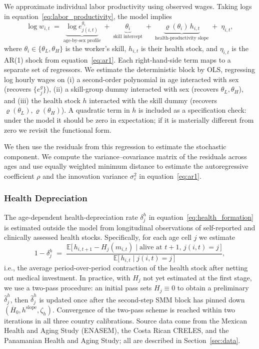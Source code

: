 \documentclass[12pt,a4paper]{article}
\begin{document}
We approximate individual labor productivity using observed wages. Taking logs in equation~\eqref{eq:labor_productivity}, the model implies
\begin{equation}
\label{eq:logwage_decomp}
\log w_{i,t} \;=\; \underbrace{\log e^{g_i}_{j(i,t)}}_{\text{age-by-sex profile}} \;+\; \underbrace{\theta_{i}}_{\text{skill intercept}} \;+\; \underbrace{\varrho(\theta_i)\, h_{i,t}}_{\text{health-productivity slope}} \;+\; \eta_{i,t},
\end{equation}
where $\theta_i \in \{\theta_L, \theta_H\}$ is the worker's skill, $h_{i,t}$ is their health stock, and $\eta_{i,t}$ is the AR(1) shock from equation~\eqref{eq:ar1}. Each right-hand-side term maps to a separate set of regressors. We estimate the deterministic block by OLS, regressing log hourly wages on (i) a second-order polynomial in age interacted with sex (recovers $\{e^{g}_{j}\}$), (ii) a skill-group dummy interacted with sex (recovers $\theta_L, \theta_H$), and (iii) the health stock $h$ interacted with the skill dummy (recovers $\varrho(\theta_L), \varrho(\theta_H)$). A quadratic term in $h$ is included as a specification check: under the model it should be zero in expectation; if it is materially different from zero we revisit the functional form.

We then use the residuals from this regression to estimate the stochastic component. We compute the variance--covariance matrix of the residuals across ages and use equally weighted minimum distance to estimate the autoregressive coefficient $\rho$ and the innovation variance $\sigma_{\varepsilon}^{2}$ in equation~\eqref{eq:ar1}.

\subsubsection{Health Depreciation}
\label{subsubsec:health_depreciation}

The age-dependent health-depreciation rate $\delta^h_j$ in equation~\eqref{eq:health_formation} is estimated outside the model from longitudinal observations of self-reported and clinically assessed health stocks. Specifically, for each age cell $j$ we estimate
\begin{equation}
\label{eq:delta_h_estimator}
1 - \delta^h_{j} \;=\; \frac{\mathbb{E}\bigl[\, h_{i,t+1} - H_{j}(m_{i,t}) \mid \text{alive at } t+1,\, j(i,t)=j \,\bigr]}{\mathbb{E}\bigl[\, h_{i,t} \mid j(i,t) = j\,\bigr]},
\end{equation}
i.e., the average period-over-period contraction of the health stock after netting out medical investment. In practice, with $H_j$ not yet estimated at the first stage, we use a two-pass procedure: an initial pass sets $H_j \equiv 0$ to obtain a preliminary $\widehat\delta^h_j$, then $\widehat\delta^h_j$ is updated once after the second-step SMM block has pinned down $(\overline{H}_0, h^{\mathrm{slope}}, \zeta_h)$. Convergence of the two-pass scheme is reached within two iterations in all three country calibrations. Source data come from the Mexican Health and Aging Study (ENASEM), the Costa Rican CRELES, and the Panamanian Health and Aging Study; all are described in Section~\ref{sec:data}.
\end{document}
